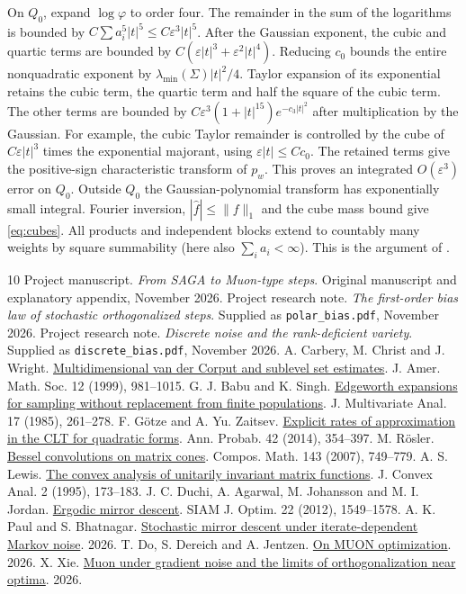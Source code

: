 \documentclass[10pt,letterpaper]{article}
\newcommand{\norm}[1]{\lVert#1\rVert}
\newcommand{\eps}{\varepsilon}
\begin{document}
On $Q_0$, expand $\log\varphi$ to order four. The remainder in the sum of the logarithms is bounded by $C\sum a_i^5|t|^5\le C\eps^3|t|^5$. After the Gaussian exponent, the cubic and quartic terms are bounded by $C(\eps|t|^3+\eps^2|t|^4)$. Reducing $c_0$ bounds the entire nonquadratic exponent by $\lambda_{\min}(\Sigma)|t|^2/4$. Taylor expansion of its exponential retains the cubic term, the quartic term and half the square of the cubic term. The other terms are bounded by $C\eps^3(1+|t|^{15})e^{-c_3|t|^2}$ after multiplication by the Gaussian. For example, the cubic Taylor remainder is controlled by the cube of $C\eps|t|^3$ times the exponential majorant, using $\eps|t|\le Cc_0$. The retained terms give the positive-sign characteristic transform of $p_w$. This proves an integrated $O(\eps^3)$ error on $Q_0$. Outside $Q_0$ the Gaussian-polynomial transform has exponentially small integral. Fourier inversion, $|\widehat f|\le\norm f_1$ and the cube mass bound give \eqref{eq:cubes}. All products and independent blocks extend to countably many weights by square summability (here also $\sum_i a_i<\infty$). This is the argument of \cite[Lemmas 1--3]{db}.

\begin{thebibliography}{10}
 Project manuscript. \emph{From SAGA to Muon-type steps}. Original manuscript and explanatory appendix, November 2026.
 Project research note. \emph{The first-order bias law of stochastic orthogonalized steps}. Supplied as \texttt{polar\_bias.pdf}, November 2026.
 Project research note. \emph{Discrete noise and the rank-deficient variety}. Supplied as \texttt{discrete\_bias.pdf}, November 2026.
 A. Carbery, M. Christ and J. Wright. \href{https://math.berkeley.edu/~mchrist/Papers/ccw.pdf}{Multidimensional van der Corput and sublevel set estimates}. J. Amer. Math. Soc. 12 (1999), 981--1015.
 G. J. Babu and K. Singh. \href{https://doi.org/10.1016/0047-259X(85)90084-3}{Edgeworth expansions for sampling without replacement from finite populations}. J. Multivariate Anal. 17 (1985), 261--278.
 F. G\"otze and A. Yu. Zaitsev. \href{https://arxiv.org/abs/1104.0519}{Explicit rates of approximation in the CLT for quadratic forms}. Ann. Probab. 42 (2014), 354--397.
 M. R\"osler. \href{https://arxiv.org/abs/math/0512474}{Bessel convolutions on matrix cones}. Compos. Math. 143 (2007), 749--779.
 A. S. Lewis. \href{https://people.orie.cornell.edu/aslewis/publications/95-convex.pdf}{The convex analysis of unitarily invariant matrix functions}. J. Convex Anal. 2 (1995), 173--183.
 J. C. Duchi, A. Agarwal, M. Johansson and M. I. Jordan. \href{https://arxiv.org/abs/1105.4681}{Ergodic mirror descent}. SIAM J. Optim. 22 (2012), 1549--1578.
 A. K. Paul and S. Bhatnagar. \href{https://arxiv.org/abs/2605.15538}{Stochastic mirror descent under iterate-dependent Markov noise}. 2026.
 T. Do, S. Dereich and A. Jentzen. \href{https://arxiv.org/abs/2608.04607}{On MUON optimization}. 2026.
 X. Xie. \href{https://arxiv.org/abs/2609.32861}{Muon under gradient noise and the limits of orthogonalization near optima}. 2026.
\end{thebibliography}
\end{document}
